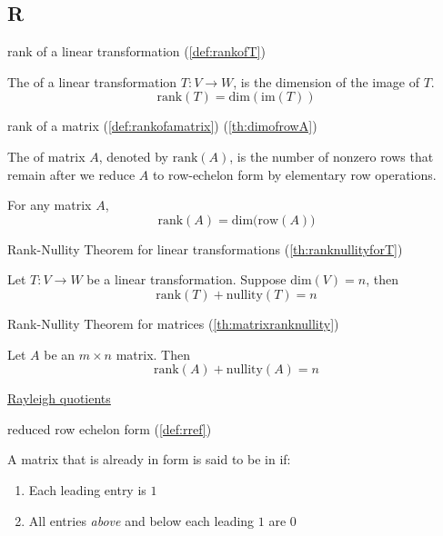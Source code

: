\documentclass{ximera}
\begin{document}
\subsection*{R}


rank of a linear transformation (\ref{def:rankofT})
\begin{expandable}{}{}
    The  of a linear transformation $T:V\rightarrow W$, is the dimension of the image of $T$.
$$\mbox{rank}(T)=\mbox{dim}(\mbox{im}(T))$$
\end{expandable}

rank of a matrix (\ref{def:rankofamatrix}) (\ref{th:dimofrowA})
\begin{expandable}{}{}
    The  of matrix $A$, denoted by $\mbox{rank}(A)$, is the number of nonzero rows that remain after we reduce $A$ to row-echelon form by elementary row operations.

    For any matrix $A$,  
$$\mbox{rank}(A)=\mbox{dim}\Big(\mbox{row}(A)\Big)$$

\end{expandable}

Rank-Nullity Theorem for linear transformations (\ref{th:ranknullityforT})
\begin{expandable}{}{}
    Let $T:V\rightarrow W$ be a linear transformation.  Suppose $\mbox{dim}(V)=n$, then
$$\mbox{rank}(T)+\mbox{nullity}(T)=n$$
\end{expandable}

Rank-Nullity Theorem for matrices (\ref{th:matrixranknullity})
\begin{expandable}{}{}
    Let $A$ be an $m\times n$ matrix.  Then 
$$\mbox{rank}(A)+\mbox{nullity}(A)=n$$
\end{expandable}

\href{https://ximera.osu.edu/linearalgebradzv3/LinearAlgebraInteractiveIntro/EIG-0070/main}{Rayleigh quotients}

reduced row echelon form (\ref{def:rref})
\begin{expandable}{}{}
    A matrix that is already in  form is said to be in  if:
\begin{enumerate}
\item Each leading entry is $1$
\item All entries {\it above} and below each leading $1$ are $0$
\end{enumerate}
\end{expandable}
\end{document}

